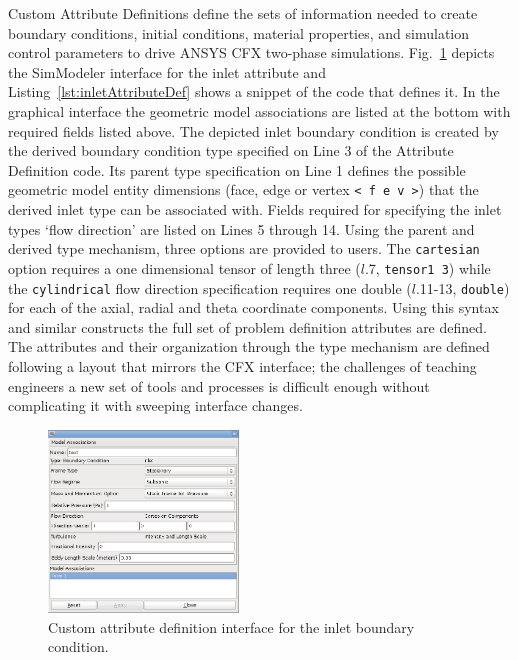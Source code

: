 Custom Attribute Definitions define the sets of information needed to create
boundary conditions, initial conditions, material properties, and simulation
control parameters to drive ANSYS CFX two-phase simulations.
Fig.~\ref{fig:inletAttribute} depicts the SimModeler interface for the inlet
attribute and Listing~\ref{lst:inletAttributeDef} shows a snippet of the code
that defines it.
In the graphical interface the geometric model associations are listed at the
bottom with required fields listed above.
The depicted inlet boundary condition is created by the derived boundary
condition type specified on Line 3 of the Attribute Definition code.
Its parent type specification on Line 1 defines the possible
geometric model entity dimensions (face, edge or vertex \texttt{< f e v >})
that the derived inlet type can be associated with.
Fields required for specifying the inlet types `flow direction' are listed on
Lines 5 through 14.
Using the parent and derived type mechanism, three options are provided to
users.
The \texttt{cartesian} option requires a one dimensional tensor
of length three ($l.$7, \texttt{tensor1 3}) while the \texttt{cylindrical} flow
direction specification requires one double ($l.$11-13, \texttt{double}) for
each of the axial, radial and theta coordinate components.
Using this syntax and similar constructs the full set of problem definition
attributes are defined.
The attributes and their organization through the type mechanism are defined
following a layout that mirrors the CFX interface; the challenges of teaching
engineers a new set of tools and processes is difficult enough without
complicating it with sweeping interface changes.


\begin{figure} \centering
  \includegraphics[width=0.45\textwidth]{figures/simModelerInletBC.png}
  \caption{
    Custom attribute definition interface for the inlet boundary
    condition.
  }
  \label{fig:inletAttribute}
\end{figure}

